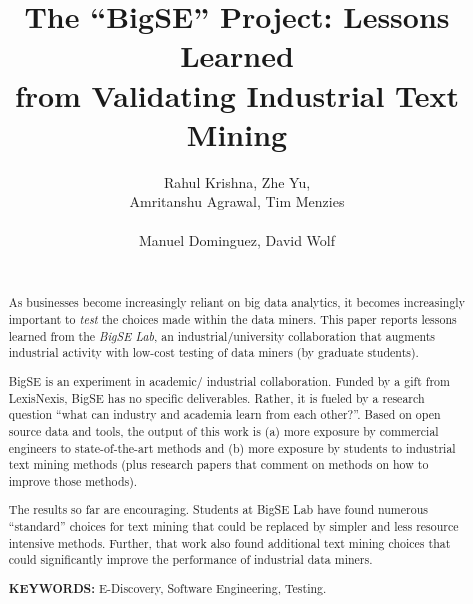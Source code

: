 \documentclass{sig-alternate-05-2015}
\theoremstyle{break}
\begin{document}

\title{The ``BigSE'' Project: Lessons Learned \\from Validating  Industrial Text Mining  }
\author{
\alignauthor
Rahul Krishna,  Zhe Yu, \\ Amritanshu Agrawal, Tim Menzies\\ %
       \\
\alignauthor
Manuel Dominguez,  David Wolf \\%
       \\
}
\maketitle
 
\begin{abstract}

As businesses become increasingly reliant on big data   analytics, it becomes
increasingly important to {\em test} the choices made within the data miners.
This paper reports   lessons learned from the  {\em BigSE Lab}, an industrial/university
collaboration that augments industrial activity with low-cost testing
of data miners (by  graduate students).  

 BigSE is an experiment in academic/ industrial collaboration.
  Funded by a gift from LexisNexis, BigSE has no specific deliverables. Rather, it is fueled by a research question ``what can
  industry and academia learn from each other?''. Based on open source
  data and tools, the output of this work is (a) more exposure by commercial engineers to state-of-the-art methods and (b) more
  exposure by  students
    to  industrial text mining methods (plus research
  papers that comment on methods on how to improve  those methods).

The results so far are encouraging. Students
at  BigSE Lab have found numerous ``standard'' choices for
text mining that could be replaced by  simpler and less resource intensive methods. Further, that work also found additional text mining choices that could significantly improve the performance of   industrial data miners.
 

{\bf KEYWORDS:}
E-Discovery,  Software Engineering, Testing.

\end{abstract}
\end{document}
